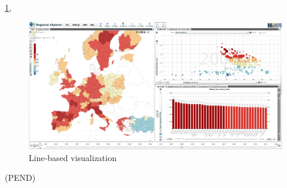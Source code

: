 \ref{fig:web_based_desktop_visualization}, 
\begin{figure}[h]
\begin{adjustbox}{width=1.2\textwidth,center=\textwidth}
  \centering
  \includegraphics[scale=.5]{images/visualization_desktop_example.png}
\end{adjustbox}
  \caption[Line-based visualization]{Line-based visualization}
  \label{fig:web_based_desktop_visualization}
\end{figure}
\fi

(PEND)




